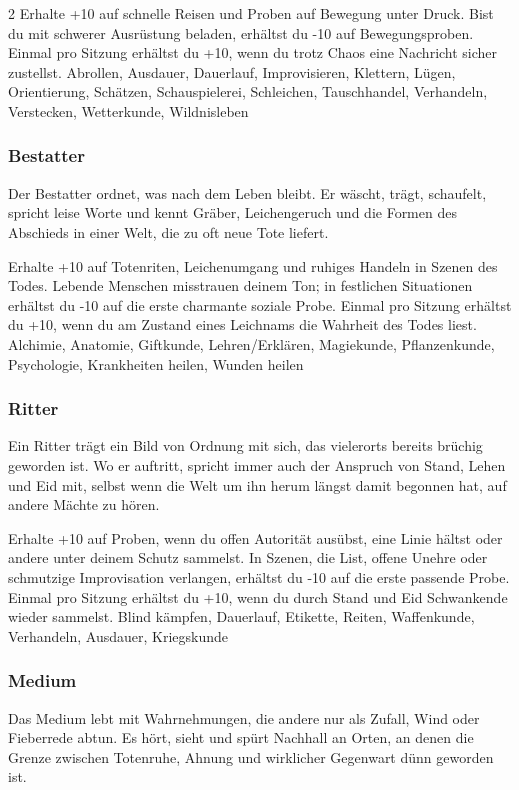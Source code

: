 {\begin{multicols*}{2}
        \wegespielwertebox
        {Erhalte +10 auf schnelle Reisen und Proben auf Bewegung unter Druck.}
        {Bist du mit schwerer Ausrüstung beladen, erhältst du -10 auf Bewegungsproben.}
        {Einmal pro Sitzung erhältst du +10, wenn du trotz Chaos eine Nachricht sicher zustellst.}
        {Abrollen, Ausdauer, Dauerlauf, Improvisieren, Klettern, Lügen, Orientierung, Schätzen, Schauspielerei, Schleichen, Tauschhandel, Verhandeln, Verstecken, Wetterkunde, Wildnisleben}

        \subsubsection*{Bestatter}
        Der Bestatter ordnet, was nach dem Leben bleibt. Er wäscht, trägt, schaufelt, spricht leise Worte und kennt Gräber, Leichengeruch und die Formen des Abschieds in einer Welt, die zu oft neue Tote liefert.

        \wegespielwertebox
        {Erhalte +10 auf Totenriten, Leichenumgang und ruhiges Handeln in Szenen des Todes.}
        {Lebende Menschen misstrauen deinem Ton; in festlichen Situationen erhältst du -10 auf die erste charmante soziale Probe.}
        {Einmal pro Sitzung erhältst du +10, wenn du am Zustand eines Leichnams die Wahrheit des Todes liest.}
        {Alchimie, Anatomie, Giftkunde, Lehren/Erklären, Magiekunde, Pflanzenkunde, Psychologie, Krankheiten heilen, Wunden heilen}

        \subsubsection*{Ritter}
        Ein Ritter trägt ein Bild von Ordnung mit sich, das vielerorts bereits brüchig geworden ist. Wo er auftritt, spricht immer auch der Anspruch von Stand, Lehen und Eid mit, selbst wenn die Welt um ihn herum längst damit begonnen hat, auf andere Mächte zu hören.

        \wegespielwertebox
        {Erhalte +10 auf Proben, wenn du offen Autorität ausübst, eine Linie hältst oder andere unter deinem Schutz sammelst.}
        {In Szenen, die List, offene Unehre oder schmutzige Improvisation verlangen, erhältst du -10 auf die erste passende Probe.}
        {Einmal pro Sitzung erhältst du +10, wenn du durch Stand und Eid Schwankende wieder sammelst.}
        {Blind kämpfen, Dauerlauf, Etikette, Reiten, Waffenkunde, Verhandeln, Ausdauer, Kriegskunde}

        \subsubsection*{Medium}
        Das Medium lebt mit Wahrnehmungen, die andere nur als Zufall, Wind oder Fieberrede abtun. Es hört, sieht und spürt Nachhall an Orten, an denen die Grenze zwischen Totenruhe, Ahnung und wirklicher Gegenwart dünn geworden ist.


\end{multicols*}}
